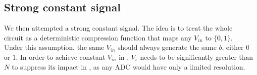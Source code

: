 %
%
%


\subsection{Strong constant signal} \label{Constant}
We then attempted a strong constant signal. The idea is to treat the whole circuit as a deterministic compression function that maps any $V_{in}$ to $\{0,1\}$. Under this assumption, the same $V_{in}$ should always generate the same $b$, either $0$ or $1$.
In order to achieve constant $V_{in}$ in , $V_s$ needs to be significantly greater than $N$ to suppress its impact in , as any ADC would have only a limited resolution.

